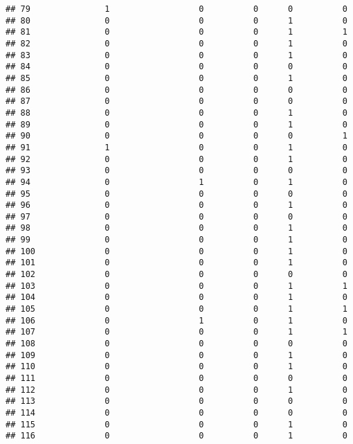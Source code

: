 \documentclass[
]{article}
\begin{document}
\begin{verbatim}
## 79               1                  0          0      0          0
## 80               0                  0          0      1          0
## 81               0                  0          0      1          1
## 82               0                  0          0      1          0
## 83               0                  0          0      1          0
## 84               0                  0          0      0          0
## 85               0                  0          0      1          0
## 86               0                  0          0      0          0
## 87               0                  0          0      0          0
## 88               0                  0          0      1          0
## 89               0                  0          0      1          0
## 90               0                  0          0      0          1
## 91               1                  0          0      1          0
## 92               0                  0          0      1          0
## 93               0                  0          0      0          0
## 94               0                  1          0      1          0
## 95               0                  0          0      0          0
## 96               0                  0          0      1          0
## 97               0                  0          0      0          0
## 98               0                  0          0      1          0
## 99               0                  0          0      1          0
## 100              0                  0          0      1          0
## 101              0                  0          0      1          0
## 102              0                  0          0      0          0
## 103              0                  0          0      1          1
## 104              0                  0          0      1          0
## 105              0                  0          0      1          1
## 106              0                  1          0      1          0
## 107              0                  0          0      1          1
## 108              0                  0          0      0          0
## 109              0                  0          0      1          0
## 110              0                  0          0      1          0
## 111              0                  0          0      0          0
## 112              0                  0          0      1          0
## 113              0                  0          0      0          0
## 114              0                  0          0      0          0
## 115              0                  0          0      1          0
## 116              0                  0          0      1          0

\end{verbatim}
\end{document}
